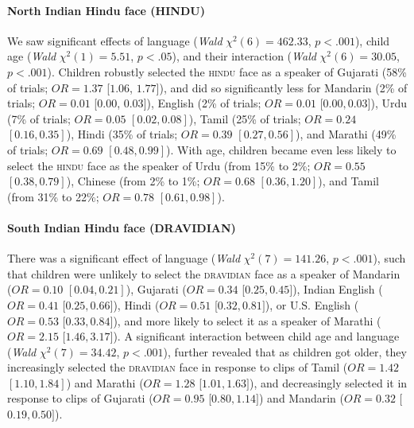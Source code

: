 \documentclass{foushee-adapted-preprint}
\begin{document}
\paragraph*{North Indian Hindu face {\small{(HINDU)}}} 
We saw significant effects of language (\textit{Wald} $\chi^2(6)=462.33$, $p<.001$), child age (\textit{Wald} $\chi^2(1)=5.51$, $p<.05$), and their interaction (\textit{Wald} $\chi^2(6)=30.05$, $p<.001$).
Children robustly selected the \textsc{hindu} face as a speaker of Gujarati (58\% of trials; $OR=1.37$ [$1.06$, $1.77$]), and did so significantly less for Mandarin (2\% of trials; 
$OR=0.01$ [$0.00$, $0.03$]), 
English (2\% of trials; 
$OR=0.01$ [$0.00, 0.03]$), 
Urdu (7\% of trials; 
$OR=0.05$ $[0.02, 0.08]$), 
Tamil (25\% of trials; 
$OR=0.24$ $[0.16, 0.35]$), 
Hindi (35\% of trials; 
$OR=0.39$ $[0.27, 0.56]$), and 
Marathi (49\% of trials; 
$OR=0.69$ $[0.48, 0.99]$). 
With age, children became even less likely to select the \textsc{hindu} face as the speaker of Urdu (from 15\% to 2\%;
$OR=0.55$ $[0.38, 0.79]$), 
Chinese (from 2\% to 1\%; 
$OR=0.68$ $[0.36, 1.20]$), and 
Tamil (from 31\% to 22\%; 
$OR=0.78$ $[0.61, 0.98]$).
%
\paragraph*{South Indian Hindu face {\small{(DRAVIDIAN)}}}  
There was a significant effect of language (\textit{Wald} $\chi^2(7)=141.26$, $p<.001$), such that children were unlikely to select the \textsc{dravidian} face as a speaker of Mandarin ($OR=0.10$ $[0.04, 0.21]$), Gujarati ($OR=0.34$ [$0.25, 0.45]$), Indian English ($OR=0.41$ [$0.25, 0.66]$), Hindi ($OR=0.51$ [$0.32, 0.81]$), or U.S. English ($OR=0.53$ [$0.33, 0.84]$), and more likely to select it as a speaker of Marathi ($OR=2.15$ [$1.46, 3.17]$). 
A significant interaction between child age and language (\textit{Wald} $\chi^2(7)=34.42$, $p<.001$), further revealed that as children got older, they increasingly selected the \textsc{dravidian} face in response to clips of Tamil ($OR=1.42$ $[1.10, 1.84]$) and Marathi ($OR=1.28$ [$1.01, 1.63]$), and decreasingly selected it in response to clips of Gujarati ($OR=0.95$ [$0.80, 1.14]$) and Mandarin ($OR=0.32$ [$0.19, 0.50]$). 
%
\end{document}
